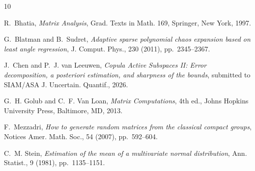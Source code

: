 \begin{thebibliography}{10}

{\sc R.~Bhatia}, {\em Matrix Analysis}, Grad. Texts in Math. 169, Springer, New York, 1997.

{\sc G.~Blatman and B.~Sudret}, {\em Adaptive sparse polynomial chaos expansion based on least angle regression}, J. Comput. Phys., 230 (2011), pp.~2345--2367.

{\sc J.~Chen and P.~J. van Leeuwen}, {\em Copula Active Subspaces II: Error decomposition, a posteriori estimation, and sharpness of the bounds}, submitted to SIAM/ASA J. Uncertain. Quantif., 2026.

{\sc G.~H. Golub and C.~F. Van Loan}, {\em Matrix Computations}, 4th ed., Johns Hopkins University Press, Baltimore, MD, 2013.

{\sc F.~Mezzadri}, {\em How to generate random matrices from the classical compact groups}, Notices Amer. Math. Soc., 54 (2007), pp.~592--604.

{\sc C.~M. Stein}, {\em Estimation of the mean of a multivariate normal distribution}, Ann. Statist., 9 (1981), pp.~1135--1151.

\end{thebibliography}
